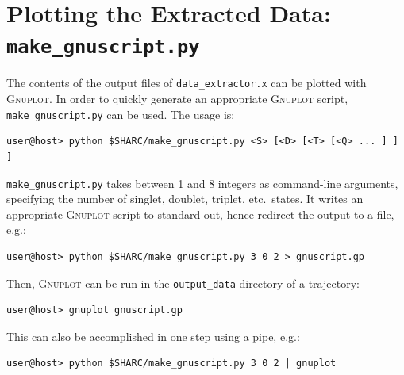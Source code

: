 \documentclass[a4paper,11pt,DIV=15,openany,twoside=false]{scrbook}
\newcommand{\ttt}[1]{\texttt{#1}}
\begin{document}
\section{Plotting the Extracted Data: \ttt{make\_gnuscript.py}}\label{sec:make_gnuscript.py}

The contents of the output files of \ttt{data\_extractor.x} can be plotted with \textsc{Gnuplot}. In order to quickly generate an appropriate \textsc{Gnuplot} script, \ttt{make\_gnuscript.py} can be used. The usage is:
\begin{verbatim}
user@host> python $SHARC/make_gnuscript.py <S> [<D> [<T> [<Q> ... ] ] ]
\end{verbatim}
\ttt{make\_gnuscript.py} takes between 1 and 8 integers as command-line arguments, specifying the number of singlet, doublet, triplet, etc.\ states. It writes an appropriate \textsc{Gnuplot} script to standard out, hence redirect the output to a file, e.g.:
\begin{verbatim}
user@host> python $SHARC/make_gnuscript.py 3 0 2 > gnuscript.gp
\end{verbatim}


Then, \textsc{Gnuplot} can be run in the \ttt{output\_data} directory of a trajectory:
\begin{verbatim}
user@host> gnuplot gnuscript.gp
\end{verbatim}
This can also be accomplished in one step using a pipe, e.g.:
\begin{verbatim}
user@host> python $SHARC/make_gnuscript.py 3 0 2 | gnuplot
\end{verbatim}
\end{document}
